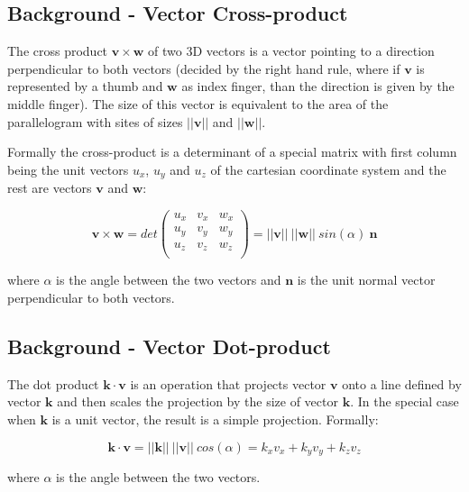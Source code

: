 \subsection{Background - Vector Cross-product}

The cross product $\bm{v} \times \bm{w}$ of two 3D vectors is a vector pointing to a direction perpendicular to both vectors (decided by the right hand rule, where if $\bm{v}$  is represented by a thumb and $\bm{w}$ as index finger, than the direction is given by the middle finger). The size of this vector is equivalent to the area of the parallelogram with sites of sizes $||\bm{v}||$ and $||\bm{w}||$.

Formally the cross-product is a determinant of a special matrix with first column being the unit vectors $u_x$, $u_y$ and $u_z$ of the cartesian coordinate system and the rest are vectors $\bm{v}$ and $\bm{w}$:

$$\bm{v} \times \bm{w} = det
\left(
\begin{array}{ccc}
    u_x & v_{x} & w_{x}\\
    u_y & v_{y} & w_{y}\\
    u_z & v_{z} & w_{z}\\
\end{array}
\right) = ||\bm{v}||~||\bm{w}||~sin(\alpha)~\bm{n}
$$

where $\alpha$ is the angle between the two vectors and $\bm{n}$ is the unit normal vector perpendicular to both vectors.

\subsection{Background - Vector Dot-product}

The dot product $\bm{k} \cdot \bm{v}$ is an operation that projects vector $\bm{v}$ onto a line defined by vector $\bm{k}$ and then scales the projection by the size of vector $\bm{k}$. In the special case when $\bm{k}$ is a unit vector, the result is a simple projection. Formally:

$$\bm{k} \cdot \bm{v} = ||\bm{k}||~||\bm{v}||~cos(\alpha) = k_x v_x + k_y v_y + k_z v_z$$

where $\alpha$ is the angle between the two vectors.

